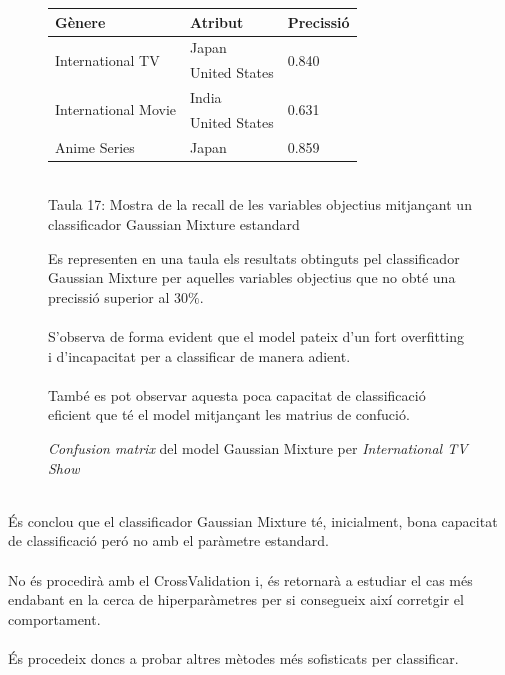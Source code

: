 \documentclass[a4paper, 11pt]{article}
\begin{document}
\begin{figure}[h]
\begin{minipage}{5cm}
\begin{center}
    \caption{\textit{Confusion matrix} del model Gaussian Mixture per \textit{International TV Show}}
\end{center}
\end{minipage} %
\hspace{2em}
\begin{minipage}{9cm} %
\begin{center}
    \begin{tabular}{l|l|l}
        \textbf{Gènere} & \textbf{Atribut} & \textbf{Precissió}\\\hline\hline
        \multirow{2}{*}{International TV} &  Japan & \multirow{2}{*}{0.840} \\
        & United States & \\\hline
        \multirow{2}{*}{International Movie} &  India & \multirow{2}{*}{0.631} \\
            & United States & \\ \hline
        Anime Series & Japan & 0.859\\ 
    \end{tabular}
    \label{tab:afins}
    \\
    Taula 17: Mostra de la recall de les variables objectius mitjançant un classificador Gaussian Mixture estandard   \setcounter{table}{17}
\end{center}
Es representen en una taula els resultats obtinguts pel classificador Gaussian Mixture per aquelles variables objectius que no obté una precissió superior al $30\%$.\\\\
S'observa de forma evident que el model pateix d'un fort overfitting i d'incapacitat per a classificar de manera adient.\\\\
També es pot observar aquesta poca capacitat de classificació eficient que té el model mitjançant les matrius de confució.
\end{minipage} %
\end{figure} %
\\
És conclou que el classificador Gaussian Mixture té, inicialment, bona capacitat de classificació peró no amb el paràmetre estandard.\\\\
No és procedirà amb el CrossValidation i, és retornarà a estudiar el cas més endabant en la cerca de hiperparàmetres per si consegueix així corretgir el comportament.\\\\
És procedeix doncs a probar altres mètodes més sofisticats per classificar.
\newpage
\end{document}

